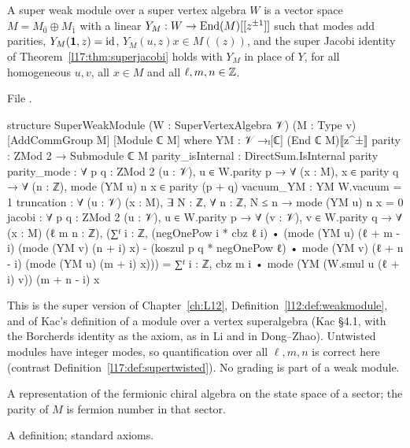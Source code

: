\begin{definition}\label{l17:def:superweak}
A super weak module over a super vertex algebra $W$ is a vector space $M=M_{\bar0}\oplus M_{\bar1}$
with a linear $Y_M:W\to\operatorname{End}(M)[[z^{\pm1}]]$ such that modes add parities, $Y_M(\mathbf{1},z)=\mathrm{id}$,
$Y_M(u,z)x\in M((z))$, and the super Jacobi identity of Theorem~\ref{l17:thm:superjacobi} holds with
$Y_M$ in place of $Y$, for all homogeneous $u,v$, all $x\in M$ and all $\ell,m,n\in{\mathbb{Z}}$.
\end{definition}
\noindent File .
\begin{leancode}
structure SuperWeakModule (W : SuperVertexAlgebra 𝒱) (M : Type v)
    [AddCommGroup M] [Module ℂ M] where
  YM : 𝒱 →ₗ[ℂ] (End ℂ M)⟦z^±⟧
  parity : ZMod 2 → Submodule ℂ M
  parity_isInternal : DirectSum.IsInternal parity
  parity_mode : ∀ {p q : ZMod 2} (u : 𝒱), u ∈ W.parity p → ∀ (x : M), x ∈ parity q →
    ∀ (n : ℤ), mode (YM u) n x ∈ parity (p + q)
  vacuum_YM : YM W.vacuum = 1
  truncation : ∀ (u : 𝒱) (x : M), ∃ N : ℤ, ∀ n : ℤ, N ≤ n → mode (YM u) n x = 0
  jacobi : ∀ {p q : ZMod 2} (u : 𝒱), u ∈ W.parity p → ∀ (v : 𝒱), v ∈ W.parity q →
    ∀ (x : M) (ℓ m n : ℤ),
    (∑ᶠ i : ℤ, (negOnePow i * cbz ℓ i) •
        (mode (YM u) (ℓ + m - i) (mode (YM v) (n + i) x)
          - (koszul p q * negOnePow ℓ) • mode (YM v) (ℓ + n - i) (mode (YM u) (m + i) x)))
      = ∑ᶠ i : ℤ, cbz m i • mode (YM (W.smul u (ℓ + i) v)) (m + n - i) x
\end{leancode}
\begin{dictionary}
This is the super version of Chapter~\ref{ch:L12}, Definition~\ref{l12:def:weakmodule}, and of Kac's
definition of a module over a vertex superalgebra (Kac §4.1, with the Borcherds identity as the
axiom, as in Li and in Dong--Zhao). Untwisted modules have integer modes, so quantification over all
$\ell,m,n$ is correct here (contrast Definition~\ref{l17:def:supertwisted}). No grading is part of a
weak module.
\end{dictionary}
\begin{physics}
A representation of the fermionic chiral algebra on the state space of a sector; the parity of
$M$ is fermion number in that sector.
\end{physics}
\begin{status}
A definition; standard axioms.
\end{status}

